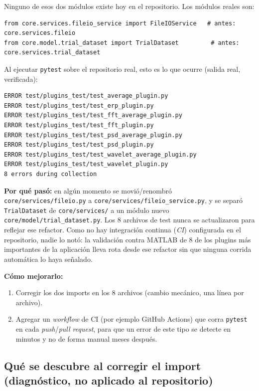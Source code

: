 \documentclass[11pt,a4paper]{article}
\begin{document}
Ninguno de esos dos módulos existe hoy en el repositorio. Los módulos reales son:

\begin{verbatim}
from core.services.fileio_service import FileIOService   # antes: core.services.fileio
from core.model.trial_dataset import TrialDataset         # antes: core.services.trial_dataset
\end{verbatim}

Al ejecutar \texttt{pytest} sobre el repositorio real, esto es lo que ocurre (salida real, verificada):

\begin{verbatim}
ERROR test/plugins_test/test_average_plugin.py
ERROR test/plugins_test/test_erp_plugin.py
ERROR test/plugins_test/test_fft_average_plugin.py
ERROR test/plugins_test/test_fft_plugin.py
ERROR test/plugins_test/test_psd_average_plugin.py
ERROR test/plugins_test/test_psd_plugin.py
ERROR test/plugins_test/test_wavelet_average_plugin.py
ERROR test/plugins_test/test_wavelet_plugin.py
8 errors during collection
\end{verbatim}

\textbf{Por qué pasó:} en algún momento se movió/renombró \texttt{core/services/fileio.py} a
\texttt{core/services/fileio\_\allowbreak service.py}, y se separó \texttt{TrialDataset} de \texttt{core/services/} a un
módulo nuevo \texttt{core/model/trial\_\allowbreak dataset.py}. Los 8 archivos de test nunca se actualizaron para
reflejar ese refactor. Como no hay integración continua (\textit{CI}) configurada en el repositorio, nadie lo
notó: la validación contra MATLAB de 8 de los plugins más importantes de la aplicación lleva rota desde ese
refactor sin que ninguna corrida automática lo haya señalado.

\textbf{Cómo mejorarlo:}
\begin{enumerate}
  \item Corregir los dos imports en los 8 archivos (cambio mecánico, una línea por archivo).
  \item Agregar un \textit{workflow} de CI (por ejemplo GitHub Actions) que corra \texttt{pytest} en cada
        \textit{push}/\textit{pull request}, para que un error de este tipo se detecte en minutos y no de
        forma manual meses después.
\end{enumerate}

\subsection{Qué se descubre al corregir el import (diagnóstico, no aplicado al repositorio)}
\label{sec:tras-fix}
\end{document}
